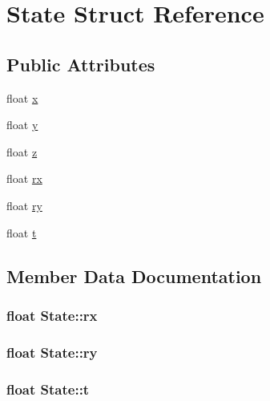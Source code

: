 \hypertarget{structState}{}\section{State Struct Reference}
\label{structState}
\subsection*{Public Attributes}
\begin{DoxyCompactItemize}
\item 
float \hyperlink{structState_a9948cc668f49246582cfd131b7928f7e}{x}
\item 
float \hyperlink{structState_a89572abb38dea3b1a780ede589a2d59b}{y}
\item 
float \hyperlink{structState_aed6ded85740f752ec9c5c2ca499da5a9}{z}
\item 
float \hyperlink{structState_a44129661bc65bbbb6147793fd196c89f}{rx}
\item 
float \hyperlink{structState_a9644786d1cc6a604052cc8eac719b888}{ry}
\item 
float \hyperlink{structState_ab1a06cd5c56832f61483d897879e2b35}{t}
\end{DoxyCompactItemize}


\subsection{Member Data Documentation}
\subsubsection[{\texorpdfstring{rx}{rx}}]{\setlength{\rightskip}{0pt plus 5cm}float State\+::rx}\hypertarget{structState_a44129661bc65bbbb6147793fd196c89f}{}\label{structState_a44129661bc65bbbb6147793fd196c89f}
\subsubsection[{\texorpdfstring{ry}{ry}}]{\setlength{\rightskip}{0pt plus 5cm}float State\+::ry}\hypertarget{structState_a9644786d1cc6a604052cc8eac719b888}{}\label{structState_a9644786d1cc6a604052cc8eac719b888}
\subsubsection[{\texorpdfstring{t}{t}}]{\setlength{\rightskip}{0pt plus 5cm}float State\+::t}\hypertarget{structState_ab1a06cd5c56832f61483d897879e2b35}{}\label{structState_ab1a06cd5c56832f61483d897879e2b35}
